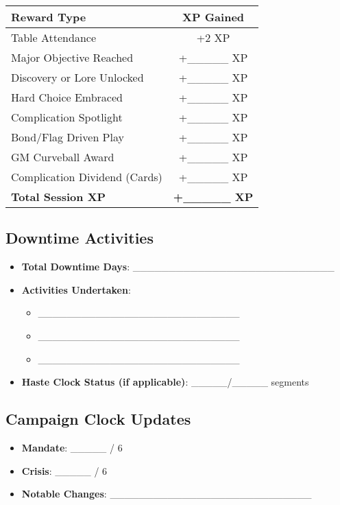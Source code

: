 \begin{tabular}{|p{5cm}|c|}
\hline
\textbf{Reward Type} & \textbf{XP Gained} \\
\hline
Table Attendance & +2 XP \\
Major Objective Reached & +\_\_\_\_\_ XP \\
Discovery or Lore Unlocked & +\_\_\_\_\_ XP \\
Hard Choice Embraced & +\_\_\_\_\_ XP \\
Complication Spotlight & +\_\_\_\_\_ XP \\
Bond/Flag Driven Play & +\_\_\_\_\_ XP \\
GM Curveball Award & +\_\_\_\_\_ XP \\
Complication Dividend (Cards) & +\_\_\_\_\_ XP \\
\textbf{Total Session XP} & \textbf{+\_\_\_\_\_ XP} \\
\hline
\end{tabular}

\subsection{Downtime Activities}

\begin{itemize}
    \item \textbf{Total Downtime Days}: \_\_\_\_\_\_\_\_\_\_\_\_\_\_\_\_\_\_\_\_\_\_\_\_\_\_\_\_
    \item \textbf{Activities Undertaken}:
    \begin{itemize}
        \item \_\_\_\_\_\_\_\_\_\_\_\_\_\_\_\_\_\_\_\_\_\_\_\_\_\_\_\_
        \item \_\_\_\_\_\_\_\_\_\_\_\_\_\_\_\_\_\_\_\_\_\_\_\_\_\_\_\_
        \item \_\_\_\_\_\_\_\_\_\_\_\_\_\_\_\_\_\_\_\_\_\_\_\_\_\_\_\_
    \end{itemize}
    \item \textbf{Haste Clock Status (if applicable)}: \_\_\_\_\_/\_\_\_\_\_ segments
\end{itemize}

\subsection{Campaign Clock Updates}

\begin{itemize}
    \item \textbf{Mandate}: \_\_\_\_\_ / 6
    \item \textbf{Crisis}: \_\_\_\_\_ / 6
    \item \textbf{Notable Changes}: \_\_\_\_\_\_\_\_\_\_\_\_\_\_\_\_\_\_\_\_\_\_\_\_\_\_\_\_
\end{itemize}

